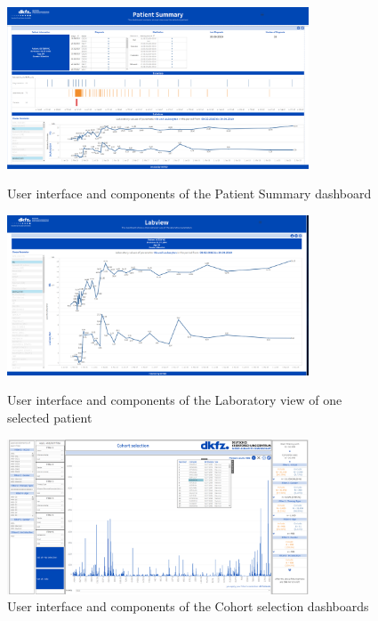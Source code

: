 \documentclass[aac,crcready]{iosart2x}
\begin{document}
\begin{figure}[HT]
\centering
\includegraphics[width=0.8\textwidth]{images/Pat sum.png}
\caption{User interface and components of the Patient Summary dashboard}\label{f2}
\includegraphics[width=0.8\textwidth]{images/Labview.png}
\caption{User interface and components of the Laboratory view of one selected patient}\label{f3}
\includegraphics[width=0.8\textwidth]{images/ch sel.png}
\caption{User interface and components of the Cohort selection dashboards}\label{f4}
\end{figure}
\end{document}
